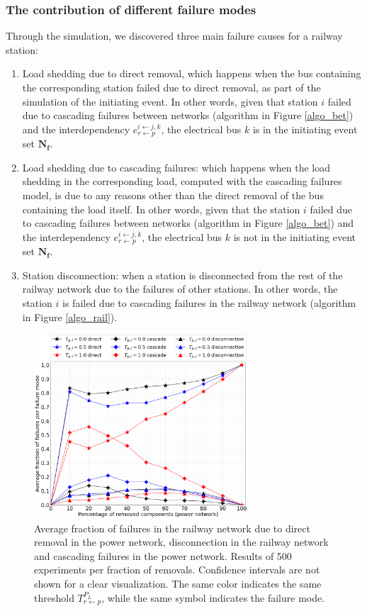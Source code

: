 \documentclass[review]{elsarticle}
\begin{document}
\subsubsection{The contribution of different failure modes}
Through the simulation, we discovered three main failure causes for a railway station:
\begin{enumerate}
	\item Load shedding due to direct removal, which happens when the bus containing the corresponding station failed due to direct removal, as part of the simulation of the initiating event. In other words, given that station $i$ failed due to cascading failures between networks (algorithm in Figure \ref{algo_bet}) and the interdependency $e^{i \leftarrow j,k}_{r\leftarrow p}$, the electrical bus $k$ is in the initiating event set $\mathbf{N_f}$.
	\item Load shedding due to cascading failures: which happens when the load shedding in the corresponding load, computed with the cascading failures model, is due to any reasons other than the direct removal of the bus containing the load itself. In other words, given that the station $i$ failed due to cascading failures between networks (algorithm in Figure \ref{algo_bet}) and the interdependency $e^{i \leftarrow j,k}_{r\leftarrow p}$, the electrical bus $k$ is not in the initiating event set $\mathbf{N_f}$.
	\item Station disconnection: when a station is disconnected from the rest of the railway network due to the failures of other stations. In other words, the station $i$ is failed due to cascading failures in the railway network (algorithm in Figure \ref{algo_rail}).
\end{enumerate}
		\begin{figure}[h]
	\centering
	\includegraphics[width=8cm]{images/perc_fail_power_to_rail.png}
	\caption{Average fraction of failures in the railway network due to direct removal in the power network, disconnection in the railway network and cascading failures in the power network. Results of 500 experiments per fraction of removals. Confidence intervals are not shown for a clear visualization. The same color indicates the same threshold $T_{r \leftarrow p}^{P_L}$, while the same symbol indicates the failure mode.}
	\label{perc_fail_power_to_rail}
\end{figure}
\end{document}
